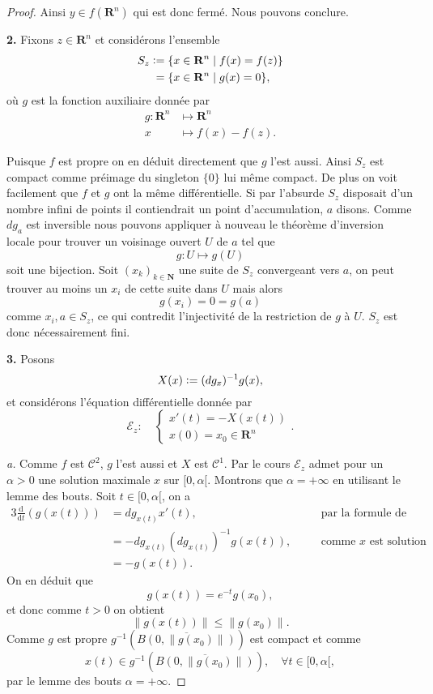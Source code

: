 \documentclass[12pt]{article}
\newcommand{\defeq}{\vcentcolon=}
\newcommand{\R}{\mathbf{R}}
\newcommand{\N}{\mathbf{N}}
\newcommand{\de}{\mathrm{d}}
\begin{document}
\begin{proof}
Ainsi $y \in f(\R^{n})$ qui est donc fermé. Nous pouvons conclure.

\bigskip

\textbf{2.} Fixons $z \in \R^{n}$ et considérons l'ensemble
\begin{align*}
        S_{z} &\defeq \{x \in \R^{n} \;|\; f(x) = f(z)\} \\
              & \; = \{x \in \R^{n} \;|\; g(x) = 0\} 
,\end{align*} où $g$ est la fonction auxiliaire donnée par
 \begin{align*}
         g : \R^{n} &\longmapsto \R^{n} \\
         x &\longmapsto f(x) - f(z)
.\end{align*}

Puisque $f$ est propre on en déduit directement que $g$ l'est aussi. Ainsi $S_{z}$ est compact comme préimage du singleton $\{0\}$ lui même compact.
De plus on voit facilement que $f$ et $g$ ont la même différentielle. Si par l'absurde $S_{z}$ disposait d'un nombre infini de points il contiendrait un point d'accumulation, $a$ disons. Comme $dg_{a}$ est inversible nous pouvons appliquer à nouveau le théorème d'inversion locale pour trouver un voisinage ouvert $U$ de $a$ tel que \[
        g : U \longmapsto g(U)
\] soit une bijection. Soit $(x_{k})_{k\in \N}$ une suite de $S_{z}$ convergeant vers $a$, on peut trouver au moins un $x_{i}$ de cette suite dans $U$ mais alors  \[
g(x_{i}) = 0 = g(a)
\] comme $x_{i}, a \in S_{z}$, ce qui contredit l'injectivité de la restriction de $g$ à $U$. $S_{z}$ est donc nécessairement fini.

\bigskip

\textbf{3.} Posons \[
        X(x) \defeq (dg_{x})^{-1}g(x)
,\] et considérons l'équation différentielle donnée par \[
\mathcal{E}_{z} : \quad \begin{cases}
        x'(t) = -X(x(t)) \\
        x(0) = x_0 \in \R^{n}
\end{cases}
.\] 

\textit{a.} Comme $f$ est $\mathcal{C}^{2}$, $g$ l'est aussi et $X$ est $\mathcal{C}^{1}$. Par le cours $\mathcal{E}_{z}$ admet pour un $\alpha > 0$ une solution maximale $x$ sur $[0, \alpha[$. Montrons que $\alpha = +\infty$ en utilisant le lemme des bouts. Soit $t \in [0,\alpha[$, on a
\begin{alignat*}{3}
        \frac{\de}{\de t}(g(x(t))) &= dg_{x(t)}x'(t), && \text{par la formule de dérivation composée}\\
                                   &= -dg_{x(t)}(dg_{x(t)})^{-1}g(x(t)), \quad && \text{comme } x \text{ est solution} \\
                                   &= -g(x(t))
.\end{alignat*}
On en déduit que \[
        g(x(t)) = e^{-t}g(x_0)
,\] et donc comme $t > 0$ on obtient  \[
\|g(x(t))\| \le \|g(x_0)\|
.\] Comme $g$ est propre $g^{-1}(\overline{B(0, \|g(x_0)\|)})$ est compact et comme \[
x(t) \in g^{-1}(\overline{B(0, \|g(x_0)\|)}), \quad \forall t \in [0,\alpha[
,\] par le lemme des bouts $\alpha = +\infty$.


\end{proof}
\end{document}
